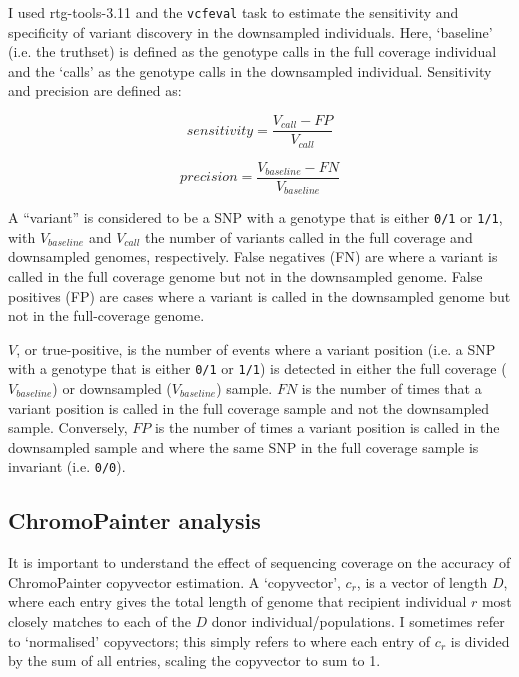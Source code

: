 I used rtg-tools-3.11 \cite{cleary2014joint} and the \texttt{vcfeval} task to estimate the sensitivity and specificity of variant discovery in the downsampled individuals. Here, `baseline' (i.e. the truthset) is defined as the genotype calls in the full coverage individual and the `calls' as the genotype calls in the downsampled individual. Sensitivity and precision are defined as: 

\begin{equation}
sensitivity = \frac{V_{call}-FP}{V_{call}}
\end{equation}

\begin{equation}
precision = \frac{V_{baseline}-FN}{V_{baseline}}
\end{equation}

A ``variant'' is considered to be a SNP with a genotype that is either \texttt{0/1} or \texttt{1/1}, with $V_{baseline}$ and $V_{call}$ the number of variants called in the full coverage and downsampled genomes, respectively. False negatives (FN) are where a variant is called in the full coverage genome but not in the downsampled genome. False positives (FP) are cases where a variant is called in the downsampled genome but not in the full-coverage genome.

$V$, or true-positive, is the number of events where a variant position (i.e. a SNP with a genotype that is either \texttt{0/1} or \texttt{1/1}) is detected in either the full coverage ($V_{baseline}$) or downsampled ($V_{baseline}$) sample. $FN$ is the number of times that a variant position is called in the full coverage sample and not the downsampled sample. Conversely, $FP$ is the number of times a variant position is called in the downsampled sample and where the same SNP in the full coverage sample is invariant (i.e. \texttt{0/0}).


\subsection{ChromoPainter analysis} \label{ChromoPainter_analysis}

It is important to understand the effect of sequencing coverage on the accuracy of ChromoPainter copyvector estimation. A `copyvector', $c_{r}$, is a vector of length $D$, where each entry gives the total length of genome that recipient individual $r$ most closely matches to each of the $D$ donor individual/populations. I sometimes refer to `normalised' copyvectors; this simply refers to where each entry of $c_r$ is divided by the sum of all entries, scaling the copyvector to sum to 1. 

